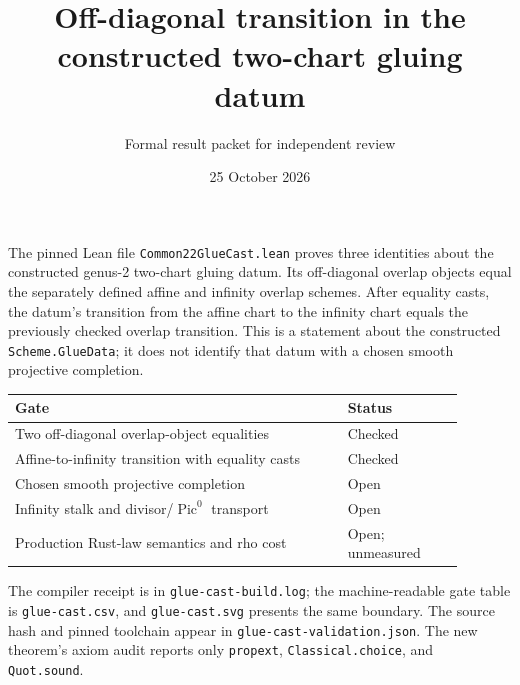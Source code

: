 \documentclass[11pt]{article}
\title{Off-diagonal transition in the constructed two-chart gluing datum}
\author{Formal result packet for independent review}
\date{25 October 2026}
\begin{document}
\maketitle
The pinned Lean file \texttt{Common22GlueCast.lean} proves three identities about
the constructed genus-2 two-chart gluing datum. Its off-diagonal overlap
objects equal the separately defined affine and infinity overlap schemes.
After equality casts, the datum's transition from the affine chart to the
infinity chart equals the previously checked overlap transition. This is a
statement about the constructed \texttt{Scheme.GlueData}; it does not identify
that datum with a chosen smooth projective completion.

\begin{center}\begin{tabular}{p{0.66\linewidth}p{0.23\linewidth}}\toprule
Gate & Status\\\midrule
Two off-diagonal overlap-object equalities & Checked\\
Affine-to-infinity transition with equality casts & Checked\\
Chosen smooth projective completion & Open\\
Infinity stalk and divisor/$\operatorname{Pic}^{0}$ transport & Open\\
Production Rust-law semantics and rho cost & Open; unmeasured\\\bottomrule
\end{tabular}\end{center}

{\small The compiler receipt is in \texttt{glue-cast-build.log}; the machine-readable
gate table is \texttt{glue-cast.csv}, and \texttt{glue-cast.svg} presents the
same boundary. The source hash and pinned toolchain appear in
\texttt{glue-cast-}\allowbreak\texttt{validation.json}. The new theorem's axiom
audit reports only \texttt{propext}, \texttt{Classical.choice}, and
\texttt{Quot.sound}.\par}
\end{document}
